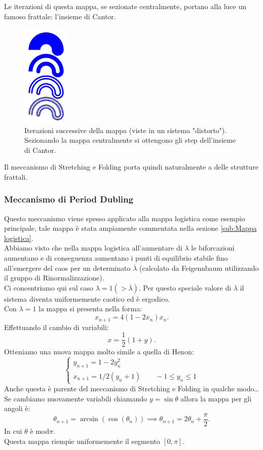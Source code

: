 \noindent
Le iterazioni di questa mappa, se sezionate centralmente, portano alla luce un famoso frattale: l'insieme di Cantor.
\begin{figure}[H]
    \centering
    \includegraphics[width=0.2\textwidth]{figures/cantor-horse.png}
    \caption{\scriptsize Iterazioni successive della mappa (viste in un sistema "distorto").\\
    Sezionando la mappa centralmente si ottengono gli step dell'insieme di Cantor.}
    \label{fig:figures-cantor-horse-png}
\end{figure}
\noindent
Il meccanismo di Stretching e Folding porta quindi naturalmente a delle strutture frattali.
\subsubsection{Meccanismo di Period Dubling}%
\label{subsub:Meccanismo di Period Dubling}
Questo meccanismo viene spesso applicato alla mappa logistica come esempio principale, tale mappa è stata ampiamente commentata nella sezione \ref{sub:Mappa logistica}.\\
Abbiamo visto che nella mappa logistica all'aumentare di $\lambda$ le biforcazioni aumentano e di conseguenza aumentano i punti di equilibrio stabile fino all'emergere del caos per un determinato $\overline{\lambda}$ (calcolato da Feigennbaum utilizzando il gruppo di Rinormalizzazione). \\
Ci concentriamo qui sul caso $\lambda  = 1 (> \overline{\lambda})$. Per questo speciale valore di $\lambda$ il sistema diventa uniformemente caotico ed è ergodico.\\ 
Con $\lambda = 1$  la mappa si presenta nella forma:
\[
    x_{n+1}=4(1-2x_n)x_n
.\] 
Effettuando il cambio di variabili:
\[
    x = \frac{1}{2}(1+y)
.\] 
Otteniamo una nuova mappa molto simile a quella di Henon:
\[
    \begin{cases}
        y_{n+1}=1-2y_{n}^2\\
	x_{n+1} = 1 /2(y_n + 1) \qquad -1 \le y_n \le 1
    \end{cases}
\] 
Anche questa è parente del meccanismo di Stretching e Folding in qualche modo\ldots\\
Se cambiamo nuovamente variabili chiamando $y = \sin\theta$  allora la mappa per gli angoli è:
\[
    \theta_{n+1} = \arcsin (\cos (\theta_n)) \implies  \theta_{n+1} = 2\theta_n + \frac{\pi}{2}
.\] 
In cui $\theta$ è mod$\pi$.\\
Questa mappa riempie uniformemente il segmento $\left[0, \pi\right]$.
\clearpage
